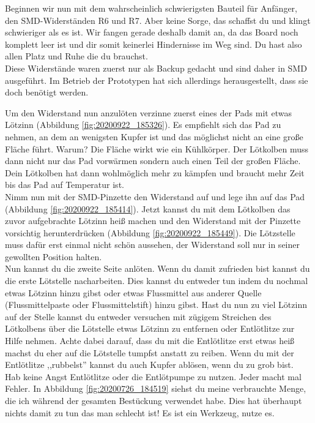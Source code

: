 \documentclass[12pt, a4paper]{article}		%
\begin{document}
Beginnen wir nun mit dem wahrscheinlich schwierigsten Bauteil für Anfänger, den SMD-Widerständen R6 und R7. Aber keine Sorge, das schaffst du und klingt schwieriger als es ist. Wir fangen gerade deshalb damit an, da das Board noch komplett leer ist und dir somit keinerlei Hindernisse im Weg sind. Du hast also allen Platz und Ruhe die du brauchst.
\\ \newline
Diese Widerstände waren zuerst nur als Backup gedacht und sind daher in SMD ausgeführt. Im Betrieb der Prototypen hat sich allerdings herausgestellt, dass sie doch benötigt werden.\\ \newline

Um den Widerstand nun anzulöten verzinne zuerst eines der Pads mit etwas Lötzinn (Abbildung \ref{fig:20200922_185326}). Es empfiehlt sich das Pad zu nehmen, an dem an wenigsten Kupfer ist und das möglichst nicht an eine große Fläche führt. Warum? Die Fläche wirkt wie ein Kühlkörper. Der Lötkolben muss dann nicht nur das Pad vorwärmen sondern auch einen Teil der großen Fläche. Dein Lötkolben hat dann wohlmöglich mehr zu kämpfen und braucht mehr Zeit bis das Pad auf Temperatur ist.\\ \newline
Nimm nun mit der SMD-Pinzette den Widerstand auf und lege ihn auf das Pad (Abbildung \ref{fig:20200922_185414}). Jetzt kannst du mit dem Lötkolben das zuvor aufgebrachte Lötzinn heiß machen und den Widerstand mit der Pinzette vorsichtig herunterdrücken (Abbildung \ref{fig:20200922_185449}). Die Lötzstelle muss dafür erst einmal nicht schön aussehen, der Widerstand soll nur in seiner gewollten Position halten.\\ \newline
Nun kannst du die zweite Seite anlöten. Wenn du damit zufrieden bist kannst du die erste Lötstelle nacharbeiten. Dies kannst du entweder tun indem du nochmal etwas Lötzinn hinzu gibst oder etwas Flussmittel aus anderer Quelle (Flussmittelpaste oder Flussmittelstift) hinzu gibst. Hast du nun zu viel Lötzinn auf der Stelle kannst du entweder versuchen mit zügigem Streichen des Lötkolbens über die Lötstelle etwas Lötzinn zu entfernen oder Entlötlitze zur Hilfe nehmen. Achte dabei darauf, dass du mit die Entlötlitze erst etwas heiß machst du eher auf die Lötstelle tumpfst anstatt zu reiben. Wenn du mit der Entlötlitze ,,rubbelst'' kannst du auch Kupfer ablösen, wenn du zu grob bist.\\ \newline
Hab keine Angst Entlötlitze oder die Entlötpumpe zu nutzen. Jeder macht mal Fehler. In Abbildung \ref{fig:20200726_184519} siehst du meine verbrauchte Menge, die ich während der gesamten Bestückung verwendet habe. Dies hat überhaupt nichts damit zu tun das man schlecht ist! Es ist ein Werkzeug, nutze es.
\end{document}
